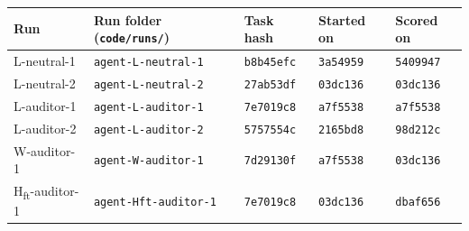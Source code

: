 \begin{tabular}{@{}lllll@{}}
\toprule
Run & Run folder (\texttt{code/runs/}) & Task hash & Started on & Scored on \\
\midrule
L-neutral-1 & \texttt{agent-L-neutral-1} & \texttt{b8b45efc} & \texttt{3a54959} & \texttt{5409947} \\
L-neutral-2 & \texttt{agent-L-neutral-2} & \texttt{27ab53df} & \texttt{03dc136} & \texttt{03dc136} \\
L-auditor-1 & \texttt{agent-L-auditor-1} & \texttt{7e7019c8} & \texttt{a7f5538} & \texttt{a7f5538} \\
L-auditor-2 & \texttt{agent-L-auditor-2} & \texttt{5757554c} & \texttt{2165bd8} & \texttt{98d212c} \\
W-auditor-1 & \texttt{agent-W-auditor-1} & \texttt{7d29130f} & \texttt{a7f5538} & \texttt{03dc136} \\
H\textsubscript{ft}-auditor-1 & \texttt{agent-Hft-auditor-1} & \texttt{7e7019c8} & \texttt{03dc136} & \texttt{dbaf656} \\
\bottomrule
\end{tabular}
